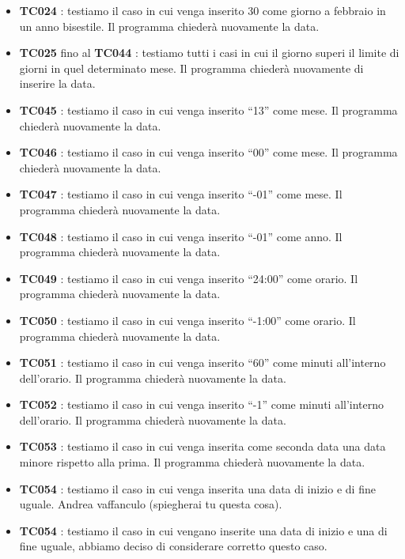 \documentclass[11pt]{scrartcl} %
\begin{document}
\begin{itemize}
	\item \textbf{TC024} : testiamo il caso  in cui venga inserito 30 come giorno a febbraio in un anno bisestile. Il programma chiederà nuovamente la data.

	\item \textbf{TC025} fino al \textbf{TC044} : testiamo tutti i casi in cui il giorno superi il limite di giorni in quel determinato mese. Il programma chiederà nuovamente di inserire la data.

	\item \textbf{TC045} : testiamo il caso in cui venga inserito “13” come mese. Il programma chiederà nuovamente la data.

	\item \textbf{TC046} : testiamo il caso in cui venga inserito “00” come mese. Il programma chiederà nuovamente la data.

	\item \textbf{TC047} : testiamo il caso in cui venga inserito “-01” come mese. Il programma chiederà nuovamente la data.

	\item \textbf{TC048} : testiamo il caso in cui venga inserito “-01” come anno. Il programma chiederà nuovamente la data.

	\item \textbf{TC049} : testiamo il caso in cui venga inserito “24:00” come orario. Il programma chiederà nuovamente la data.

	\item \textbf{TC050} : testiamo il caso in cui venga inserito “-1:00” come orario. Il programma chiederà nuovamente la data.

	\item \textbf{TC051} : testiamo il caso in cui venga inserito “60” come minuti all’interno dell’orario. Il programma chiederà nuovamente la data.

	\item \textbf{TC052} : testiamo il caso in cui venga inserito “-1” come minuti all’interno dell’orario. Il programma chiederà nuovamente la data.

	\item \textbf{TC053} : testiamo il caso in cui venga inserita come seconda data una data minore rispetto alla prima. Il programma chiederà nuovamente la data.

	\item \textbf{TC054} : testiamo il caso in cui venga inserita una data di inizio e di fine uguale. Andrea vaffanculo (spiegherai tu questa cosa).

	\item \textbf{TC054} : testiamo il caso in cui vengano inserite una data di inizio e una di fine uguale, abbiamo deciso di considerare corretto questo caso.

\end{itemize}
\end{document}

